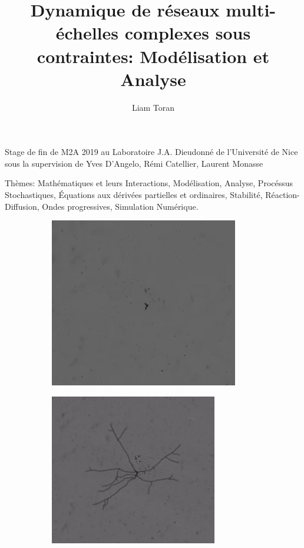 \documentclass[11pt]{article}
\title{\textbf{Dynamique de réseaux multi-échelles complexes sous contraintes: Modélisation et Analyse}}
\author{Liam Toran}
\date{}
\theoremstyle{definition}
\begin{document}
\maketitle
\vspace{-20px}
\begin{center}
Stage de fin de M2A 2019 au Laboratoire J.A. Dieudonné de l'Université de Nice\\ sous la supervision de Yves D'Angelo, Rémi Catellier, Laurent Monasse
\end{center}
{\footnotesize Thèmes: Mathématiques et leurs Interactions, Modélisation, Analyse, Procéssus Stochastiques, Équations aux dérivées partielles et ordinaires, Stabilité, Réaction-Diffusion, Ondes progressives, Simulation Numérique.}
\begin{figure}[hb]
\begin{subfigure}[b]{0.5\textwidth}
\includegraphics[width=\textwidth]{Images/1.png}
\end{subfigure}
\begin{subfigure}[b]{0.5\textwidth}
\includegraphics[width=\textwidth]{Images/2.png}

\end{subfigure}
\end{figure}
\end{document}
